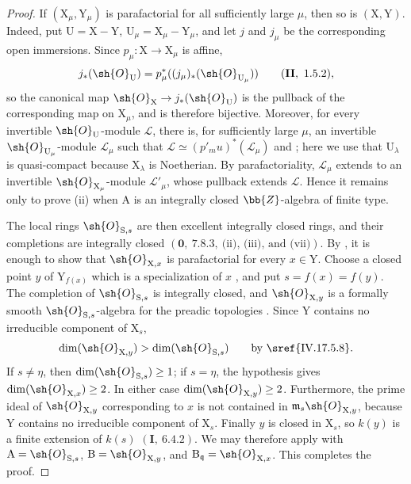\begin{proof}
If $(\mathrm{X}_\mu,\mathrm{Y}_\mu)$ is parafactorial for all sufficiently large $\mu$, then so is $(\mathrm{X},\mathrm{Y})$. Indeed, put $\mathrm{U}=\mathrm{X}-\mathrm{Y}$, $\mathrm{U}_\mu=\mathrm{X}_\mu-\mathrm{Y}_\mu$, and let $j$ and $j_\mu$ be the corresponding open immersions. Since $p_\mu:\mathrm{X}\to\mathrm{X}_\mu$ is affine,
\[
  j_*(\sh{O}_{\mathrm{U}})=p_\mu^*((j_\mu)_*(\sh{O}_{\mathrm{U}_\mu}))
  \qquad (\mathbf{II},\ 1.5.2),
\]
so the canonical map $\sh{O}_{\mathrm{X}}\to j_*(\sh{O}_{\mathrm{U}})$ is the pullback of the corresponding map on $\mathrm{X}_\mu$, and is therefore bijective. Moreover, for every invertible $\sh{O}_{\mathrm{U}}$-module $\mathscr{L}$, there is, for sufficiently large $\mu$, an invertible $\sh{O}_{\mathrm{U}_\mu}$-module $\mathscr{L}_\mu$ such that $\mathscr{L}\simeq(p'_mu)^*(\mathscr{L}_\mu)$  and ; here we use that $\mathrm{U}_\lambda$ is quasi-compact because $\mathrm{X}_\lambda$ is Noetherian. By parafactoriality, $\mathscr{L}_\mu$ extends to an invertible $\sh{O}_{\mathrm{X}_\mu}$-module $\mathscr{L}'_\mu$, whose pullback extends $\mathscr{L}$. Hence it remains only to prove (ii) when $\mathrm{A}$ is an integrally closed $\bb{Z}$-algebra of finite type.

The local rings $\sh{O}_{\mathrm{S},s}$ are then excellent integrally closed rings, and their completions are integrally closed $(\mathbf{0},\ 7.8.3,\ \text{(ii), (iii), and (vii)})$. By , it is enough to show that $\sh{O}_{\mathrm{X},x}$ is parafactorial for every $x\in\mathrm{Y}$. Choose a closed point $y$ of $\mathrm{Y}_{f(x)}$ which is a specialization of $x$ , and put $s=f(x)=f(y)$. The completion of $\sh{O}_{\mathrm{S},s}$ is integrally closed, and $\sh{O}_{\mathrm{X},y}$ is a formally smooth $\sh{O}_{\mathrm{S},s}$-algebra for the preadic topologies . Since $\mathrm{Y}$ contains no irreducible component of $\mathrm{X}_s$,
\[
  \dim(\sh{O}_{\mathrm{X},y})>\dim(\sh{O}_{\mathrm{S},s})
  \qquad\text{by \sref{IV.17.5.8}}.
\]
If $s\neq\eta$, then $\dim(\sh{O}_{\mathrm{S},s})\geq1$; if $s=\eta$, the hypothesis gives $\dim(\sh{O}_{\mathrm{X},x})\geq2$. In either case $\dim(\sh{O}_{\mathrm{X},y})\geq2$. Furthermore, the prime ideal of $\sh{O}_{\mathrm{X},y}$ corresponding to $x$ is not contained in $\mathfrak{m}_s\sh{O}_{\mathrm{X},y}$, because $\mathrm{Y}$ contains no irreducible component of $\mathrm{X}_s$. Finally $y$ is closed in $\mathrm{X}_s$, so $k(y)$ is a finite extension of $k(s)$ $(\mathbf{I},\ 6.4.2)$. We may therefore apply  with $\mathrm{A}=\sh{O}_{\mathrm{S},s}$, $\mathrm{B}=\sh{O}_{\mathrm{X},y}$, and $\mathrm{B}_{\mathfrak{q}}=\sh{O}_{\mathrm{X},x}$. This completes the proof.
\end{proof}

